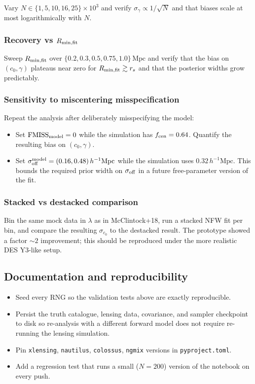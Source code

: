 \documentclass[11pt,a4paper]{article}
\newcommand{\sigmaoff}{\sigma_{\rm off}}
\newcommand{\fcen}{f_{\rm cen}}
\newcommand{\Rmin}{R_{\rm min,fit}}
\begin{document}
Vary $N \in \{1, 5, 10, 16, 25\}\times 10^3$ and verify
$\sigma_\gamma \propto 1/\sqrt{N}$ and that biases scale at most logarithmically
with $N$.

\subsubsection*{Recovery vs $\Rmin$}

Sweep $\Rmin$ over $\{0.2, 0.3, 0.5, 0.75, 1.0\}\,\mathrm{Mpc}$ and verify that
the bias on $(c_0, \gamma)$ plateaus near zero for $\Rmin \gtrsim r_s$ and that
the posterior widths grow predictably.

\subsubsection*{Sensitivity to miscentering misspecification}

Repeat the analysis after deliberately misspecifying the model:
\begin{itemize}[noitemsep]
  \item Set $\mathrm{FMISS}_{\rm model} = 0$ while the simulation has
        $\fcen=0.64$.  Quantify the resulting bias on $(c_0, \gamma)$.
  \item Set $\sigmaoff^{\rm model} = (0.16, 0.48)\,h^{-1}\mathrm{Mpc}$ while
        the simulation uses $0.32\,h^{-1}\mathrm{Mpc}$.  This bounds the
        required prior width on $\sigmaoff$ in a future free-parameter
        version of the fit.
\end{itemize}

\subsubsection*{Stacked vs destacked comparison}

Bin the same mock data in $\lambda$ as in McClintock+18, run a stacked NFW
fit per bin, and compare the resulting $\sigma_{c_0}$ to the destacked
result.  The prototype showed a factor $\sim\!2$ improvement; this should be
reproduced under the more realistic DES Y3-like setup.

\subsection{Documentation and reproducibility}

\begin{itemize}[noitemsep]
  \item Seed every RNG so the validation tests above are exactly reproducible.
  \item Persist the truth catalogue, lensing data, covariance, and sampler
        checkpoint to disk so re-analysis with a different forward model
        does not require re-running the lensing simulation.
  \item Pin \texttt{xlensing}, \texttt{nautilus}, \texttt{colossus},
        \texttt{ngmix} versions in \texttt{pyproject.toml}.
  \item Add a regression test that runs a small ($N=200$) version of the
        notebook on every push.
\end{itemize}
\end{document}

